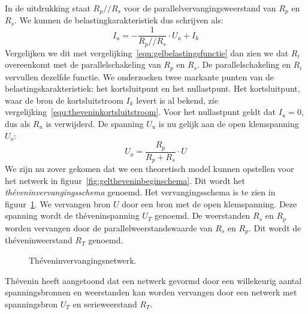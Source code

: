 %
In de uitdrukking staat $R_p // R_s$ voor de parallelvervangingsweerstand van $R_p$ en $R_s$. We kunnen de
belastingkarakteristiek dus schrijven als:
%
\begin{equation}
I_u = -\dfrac{1}{R_p//R_s}\cdot U_u + I_k
\end{equation}
%
Vergelijken we dit met vergelijking~\eqref{equ:gelbelastingsfunctie} dan zien we dat $R_i$ overeenkomt
met de parallelschakeling van $R_p$ en $R_s$. De parallelschakeling en $R_i$ vervullen dezelfde functie.
We onderzoeken twee markante punten van de belastingskarakteristiek: het kortsluitpunt en het nullastpunt.
Het kortsluitpunt, waar de bron de kortsluitstroom $I_k$ levert is al bekend, zie
vergelijking~\eqref{equ:theveninkortsluitstroom}. Voor het nullastpunt geldt dat $I_u = 0$, dus als $R_u$
is verwijderd. De spanning $U_u$ is nu gelijk aan de open klemspanning $U_o$:
%
\begin{equation}
U_o = \dfrac{R_p}{R_p+R_s}\cdot U
\end{equation}
%
We zijn nu zover gekomen dat we een theoretisch model kunnen opstellen voor het netwerk in
figuur~\ref{fig:geltheveninbeginschema}. Dit wordt het \textsl{th\'eveninvervangingsschema} genoemd. Het
vervangingsschema is
te zien in figuur~\ref{fig:geltheveninvervangingsschema}. We vervangen bron $U$ door een bron met de open
klemspanning. Deze spanning wordt de th\'eveninspanning $U_T$ genoemd. De weerstanden $R_s$ en $R_p$ worden
vervangen door de parallelweerstandswaarde van $R_s$ en $R_p$. Dit wordt de th\'eveninweerstand $R_T$
genoemd.

\begin{figure}[!ht]
\centering
{}
\captionsetup{width=.9\linewidth}
\caption{Th\'eveninvervangingsnetwerk.}
\label{fig:geltheveninvervangingsschema}
\end{figure}

Th\'evenin heeft aangetoond dat een netwerk gevormd door een willekeurig aantal spanningsbronnen en
weerstanden kan worden vervangen door een netwerk met spanningsbron $U_T$ en serieweerstand $R_T$.



